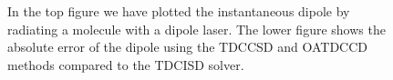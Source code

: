 \begin{figure}
            \caption{In the top figure we have plotted the instantaneous
            dipole by radiating a  molecule with a dipole laser.
            The lower figure shows the absolute error of the dipole using
            the TDCCSD and OATDCCD methods compared to the TDCISD solver.}
            \label{fig:dipole-moment-li}
        \end{figure}


